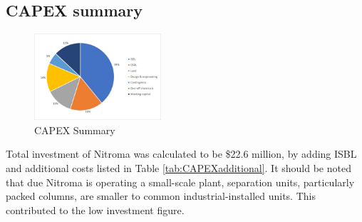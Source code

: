 \subsection{CAPEX summary}
\begin{figure}
    \vspace{-1.1cm}
    \label{fig:CAPEXSummary}
    \includegraphics[width=0.42\textwidth]{chapters/6-economics/figures/CAPEX_summary.jpg}
    \caption{CAPEX Summary}
\end{figure}
Total investment of Nitroma was calculated to be \$22.6 million, by adding ISBL and additional costs listed in Table \ref{tab:CAPEXadditional}. It should be noted that due Nitroma is operating a small-scale plant, separation units, particularly packed columns, are smaller to common industrial-installed units. This contributed to the low investment figure.